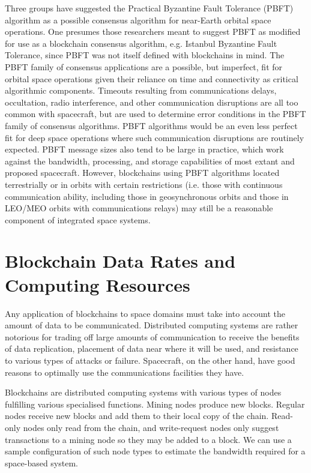 \documentclass[journal ]{new-aiaa}
\begin{document}
Three groups have suggested the Practical Byzantine Fault Tolerance (PBFT) algorithm\cite{castro_practical_1999} as a possible consensus algorithm for near-Earth orbital space operations\cite{yu_blockchain_2019,molesky_blockchain_2018,mital_blockchain_2019}. One presumes those researchers meant to suggest PBFT as modified for use as a blockchain consensus algorithm, e.g. Istanbul Byzantine Fault Tolerance\cite{lin_istanbul_2017}, since PBFT was not itself defined with blockchains in mind. The PBFT family of consensus applications are a 
possible, but imperfect, fit for orbital space operations given their reliance on time and connectivity as critical algorithmic components. Timeouts resulting from communications delays, occultation, radio interference, and other communication disruptions are all too common with spacecraft, but are used to determine error conditions in the PBFT family of consensus algorithms. PBFT algorithms would be an even less perfect fit for deep space operations where such communication disruptions are routinely expected. PBFT message sizes also tend to be large in practice, which work against the bandwidth, processing, and storage capabilities of most extant and proposed spacecraft. However, blockchains using PBFT algorithms located terrestrially or in orbits with certain restrictions (i.e. those with continuous communication ability, including those in geosynchronous orbits and those in LEO/MEO orbits with communications relays) may still be a reasonable component of integrated space systems.

\section{Blockchain Data Rates and Computing Resources}\label{sec:datarates}

Any application of blockchains to space domains must take into account the amount of data to be communicated. Distributed computing systems are rather notorious for trading off large amounts of communication to receive the benefits of data replication, placement of data near where it will be used, and resistance to various types of attacks or failure. Spacecraft, on the other hand, have good reasons to optimally use the communications facilities they have.

Blockchains are distributed computing systems with various types of nodes fulfilling various specialised functions. Mining nodes produce new blocks. Regular nodes receive new blocks and add them to their local copy of the chain. Read-only nodes only read from the chain, and write-request nodes only suggest transactions to a mining node so they may be added to a block. We can use a sample configuration of such node types to estimate the bandwidth required for a space-based system.
\end{document}
